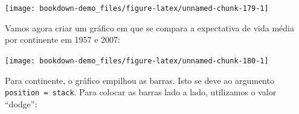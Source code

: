 \documentclass[]{book}
\newenvironment{Shaded}{\begin{snugshade}}{\end{snugshade}}
\newcommand{\KeywordTok}[1]{\textcolor[rgb]{0.13,0.29,0.53}{\textbf{#1}}}
\newcommand{\DataTypeTok}[1]{\textcolor[rgb]{0.13,0.29,0.53}{#1}}
\newcommand{\DecValTok}[1]{\textcolor[rgb]{0.00,0.00,0.81}{#1}}
\newcommand{\StringTok}[1]{\textcolor[rgb]{0.31,0.60,0.02}{#1}}
\newcommand{\CommentTok}[1]{\textcolor[rgb]{0.56,0.35,0.01}{\textit{#1}}}
\newcommand{\OperatorTok}[1]{\textcolor[rgb]{0.81,0.36,0.00}{\textbf{#1}}}
\newcommand{\NormalTok}[1]{#1}
\begin{document}
\begin{center}\texttt{[image: bookdown-demo\_files/figure-latex/unnamed-chunk-179-1]} \end{center}

Vamos agora criar um gráfico em que se compara a expectativa de vida
média por continente em 1957 e 2007:

\begin{Shaded}
\end{Shaded}

\begin{center}\texttt{[image: bookdown-demo\_files/figure-latex/unnamed-chunk-180-1]} \end{center}

Para continente, o gráfico empilhou as barras. Isto se deve ao argumento
\texttt{position\ =\ stack}. Para colocar as barras lado a lado,
utilizamos o valor ``dodge'':
\end{document}
